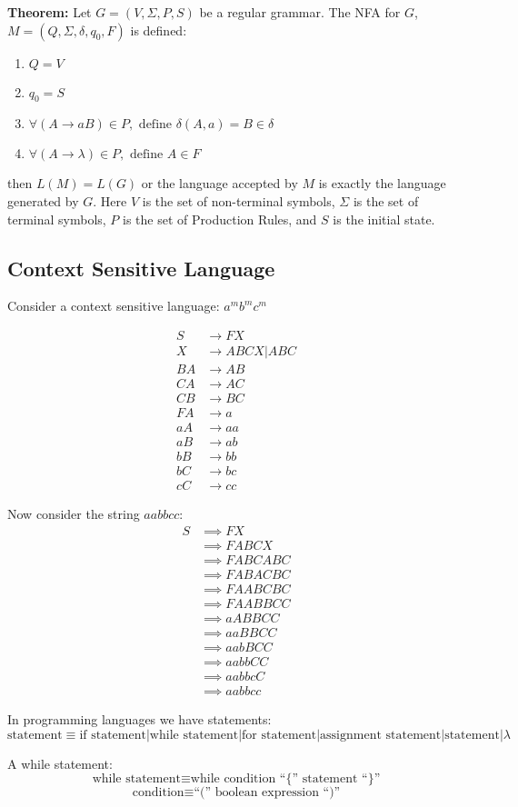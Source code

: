 \documentclass{scrartcl}
\begin{document}
\textbf{Theorem:} Let $G=(V,\Sigma,P,S)$ be a regular grammar. The NFA for $G$, $M=(Q,\Sigma,\delta,q_0,F)$ is defined:
\begin{enumerate}
\item $Q=V$
\item $q_0=S$
\item $\forall (A \rightarrow aB) \in P, \text{ define } \delta(A,a) = B \in \delta$
\item $\forall (A \rightarrow \lambda) \in P, \text{ define } A \in F$
\end{enumerate}
then $L(M)=L(G)$ or the language accepted by $M$ is exactly the language generated by $G$. Here $V$ is the set of non-terminal symbols, $\Sigma$ is the set of terminal symbols, $P$ is the set of Production Rules, and $S$ is the initial 
state.

\subsection{Context Sensitive Language}

Consider a context sensitive language: $a^mb^mc^m$

\begin{align*}
S  & \rightarrow FX\\
X  & \rightarrow ABCX | ABC\\
BA & \rightarrow AB\\
CA & \rightarrow AC\\
CB & \rightarrow BC\\
FA & \rightarrow a\\
aA & \rightarrow aa\\
aB & \rightarrow ab\\
bB & \rightarrow bb\\
bC & \rightarrow bc\\
cC & \rightarrow cc
\end{align*}

Now consider the string $aabbcc$:
\begin{align*}
S & \implies FX\\
  & \implies FABCX\\
  & \implies FABCABC\\
  & \implies FABACBC\\
  & \implies FAABCBC\\
  & \implies FAABBCC\\
  & \implies aABBCC\\
  & \implies aaBBCC\\
  & \implies aabBCC\\
  & \implies aabbCC\\
  & \implies aabbcC\\
  & \implies aabbcc
\end{align*}

In programming languages we have statements:
$$\text{statement} \equiv \text{if statement} | \text{while statement} | \text{for statement} | \text{assignment statement} | \text{statement} | \lambda$$

A while statement:
$$\text{while statement} \equiv \text{while condition ``\{'' statement ``\}''}$$
$$\text{condition} \equiv \text{``('' boolean expression ``)''}$$
\end{document}
